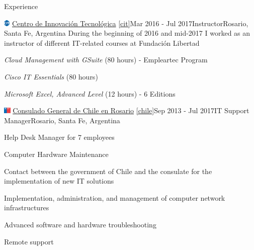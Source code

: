 \documentclass{resume} %
\begin{document}
\begin{rSection}{Experience}

    \begin{rSubsection}{\includegraphics[height=0.3cm]{images/cit.png} \href{https://www.centroit.org.ar/}{Centro de Innovación Tecnológica} \ref{cit}}{Mar 2016 - Jul 2017}{Instructor}{Rosario, Santa Fe, Argentina}
        During the beginning of 2016 and mid-2017 I worked as an instructor of different IT-related courses at Fundación Libertad
        \item \textit{Cloud Management with GSuite} (80 hours) - Empleartec Program
        \item \textit{Cisco IT Essentials} (80 hours)
        \item \textit{Microsoft Excel, Advanced Level} (12 hours) - 6 Editions
    \end{rSubsection}


    \begin{rSubsection}{\includegraphics[height=0.3cm]{images/minrel-chile.png} \href{https://chile.gob.cl/rosario/}{Consulado General de Chile en Rosario} \ref{chile}}{Sep 2013 - Jul 2017}{IT Support Manager}{Rosario, Santa Fe, Argentina}
        \item Help Desk Manager for 7 employees
        \item Computer Hardware Maintenance
        \item Contact between the government of Chile and the consulate for the implementation of new IT solutions
        \item Implementation, administration, and management of computer network infrastructures
        \item Advanced software and hardware troubleshooting
        \item Remote support
    \end{rSubsection}



\end{rSection}
\end{document}
